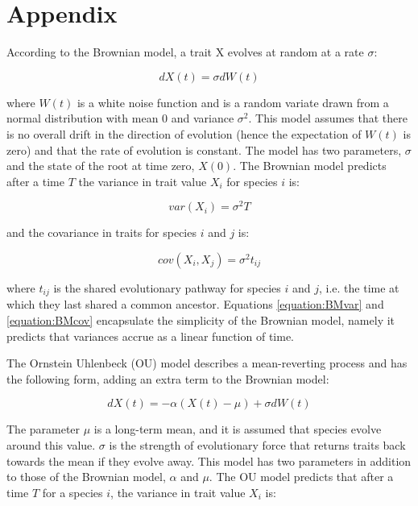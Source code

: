 \documentclass[a4paper,12pt]{article}
\begin{document}



\section{Appendix}
  \label{section:models}
  \setcounter{equation}{0}

  According to the Brownian model, a trait X evolves at random at a rate $\sigma$:

    \begin{equation}
      dX(t) = \sigma dW(t)
      \label{equation:BMrate} 
    \end{equation}

  where $W(t)$ is a white noise function and is a random variate drawn from a normal distribution with mean $0$ and variance $\sigma^2$. 
  This model assumes that there is no overall drift in the direction of evolution (hence the expectation of $W(t)$ is zero) and that the rate of evolution is constant. 
  The model has two parameters, $\sigma$ and the state of the root at time zero, $X(0)$. 
  The Brownian model predicts after a time $T$ the variance in trait value $X_i$ for species $i$ is:

    \begin{equation}
      var(X_i) = \sigma^2 T
      \label{equation:BMvar} 
    \end{equation}

  and the covariance in traits for species $i$ and $j$ is:
  
    \begin{equation}
      cov(X_i,X_j) = \sigma^2 t_{ij}
      \label{equation:BMcov} 
    \end{equation}

  where $t_{ij}$ is the shared evolutionary pathway for species $i$ and $j$, i.e. the time at which they last shared a common ancestor. 
  Equations \ref{equation:BMvar} and \ref{equation:BMcov} encapsulate the simplicity of the Brownian model, namely it predicts that variances accrue as a linear function of time. 

  The Ornstein Uhlenbeck (OU) model describes a mean-reverting process and has the following form, adding an extra term to the Brownian model:

  \begin{equation}
    dX(t) = - \alpha (X(t) - \mu) + \sigma dW(t)
    \label{equation:OUrate} 
  \end{equation}

  The parameter $\mu$ is a long-term mean, and it is assumed that species evolve around this value. 
  $\sigma$ is the strength of evolutionary force that returns traits back towards the mean if they evolve away. 
  This model has two parameters in addition to those of the Brownian model, $\alpha$ and $\mu$.
  The OU model predicts that after a time $T$ for a species $i$, the variance in trait value $X_i$ is:
\end{document}
